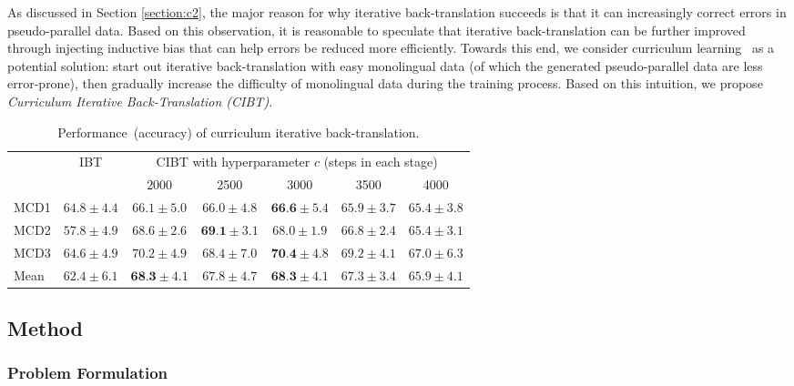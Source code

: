 \documentclass[letterpaper]{article} %
\begin{document}
As discussed in Section \ref{section:c2}, the major reason for why iterative back-translation succeeds is that it can increasingly correct errors in pseudo-parallel data.
Based on this observation, it is reasonable to speculate that iterative back-translation can be further improved through injecting inductive bias that can help errors be reduced more efficiently.
Towards this end, we consider curriculum learning~\cite{bengio2009curriculum} as a potential solution: start out iterative back-translation with easy monolingual data (of which the generated pseudo-parallel data are less error-prone), then gradually increase the difficulty of monolingual data during the training process.
Based on this intuition, we propose \emph{Curriculum Iterative Back-Translation (CIBT)}.

\begin{table}[t]
\small
    \centering
    \caption{Performance~(accuracy) of curriculum iterative back-translation.}
	\begin{tabular}{lcccccc}
	    \hline
    	\multirow{2}{*}{} & \multirow{2}{*}{IBT} & \multicolumn{5}{c}{CIBT with hyperparameter $c$ (steps in each stage)} \\ \cline{3-7}
    	 &  & 2000 & 2500 & 3000 & 3500 & 4000 \\ \cline{1-1} \cline{2-2} \cline{3-7}
         MCD1 & $  64.8 \pm 4.4 $ & $  66.1 \pm 5.0 $ & $  66.0 \pm 4.8 $ & $  \textbf{66.6} \pm 5.4 $ & $  65.9 \pm 3.7 $ & $  65.4 \pm 3.8 $ \\
        MCD2 & $  57.8 \pm 4.9 $ & $  68.6 \pm 2.6 $ & $  \textbf{69.1} \pm 3.1 $ & $  68.0 \pm 1.9 $ & $  66.8 \pm 2.4 $ & $  65.4 \pm 3.1 $ \\
        MCD3 & $  64.6 \pm 4.9 $ & $  70.2 \pm 4.9 $ & $  68.4 \pm 7.0 $ & $  \textbf{70.4} \pm 4.8 $ & $  69.2 \pm 4.1 $ & $  67.0 \pm 6.3 $ \\
        Mean & $  62.4 \pm 6.1 $ & $  \textbf{68.3} \pm 4.1 $ & $  67.8 \pm 4.7 $ & $  \textbf{68.3} \pm 4.1 $ & $  67.3 \pm 3.4 $ & $  65.9 \pm 4.1 $ \\ \hline
    \end{tabular}
	\label{cl_results_summary}
\end{table}

\subsection{Method}

\subsubsection{Problem Formulation}
\end{document}
